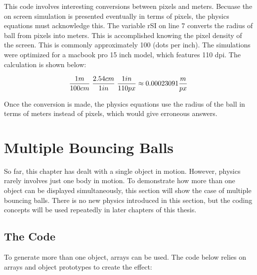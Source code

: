 This code involves interesting conversions between pixels and meters.  Becuase the on screen simulation is presented eventually in terms of pixels, the physics equations must acknowledge this.  The variable rSI on line 7 converts the radius of ball from pixels into meters.  This is accomplished knowing the pixel density of the screen.  This is commonly approximately 100 (dots per inch).  The simulations were optimized for a macbook pro 15 inch model, which features 110 dpi.  The calculation is shown below:

\begin{equation}\label{eq:pixels}
\frac{1m}{100 cm} \hspace{1mm} \frac{2.54 cm}{1 in}  \hspace{1mm}   \frac{1 in}{110 px} \approx  0.00023091 \frac{m}{px}
\end{equation}

Once the conversion is made, the physics equations use the radius of the ball in terms of meters instead of pixels, which would give erroneous answers.

\section{Multiple Bouncing Balls}

So far, this chapter has dealt with a single object in motion.  However, physics rarely involves just one body in motion.  To demonstrate how more than one object can be displayed simultaneously, this section will show the case of multiple bouncing balls.  There is no new physics introduced in this section, but the coding concepts will be used repeatedly in later chapters of this thesis.

\subsection{The Code}

To generate more than one object, arrays can be used.  The code below relies on arrays and object prototypes to create the effect:

